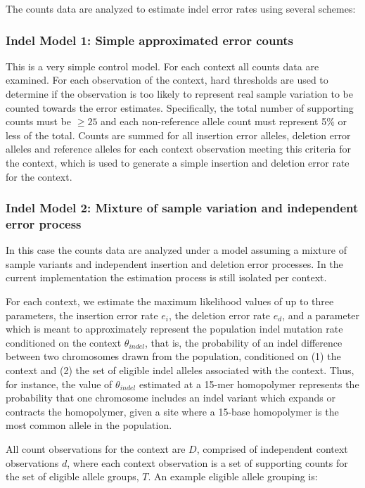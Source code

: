 \documentclass{article}
\begin{document}
The counts data are analyzed to estimate indel error rates using several schemes:

\subsubsection{Indel Model 1: Simple approximated error counts}

This is a very simple control model. For each context all counts data are examined. For each observation of the context, hard thresholds are used to determine if the observation is too likely to represent real sample variation to be counted towards the error estimates. Specifically, the total number of supporting counts must be $\geq 25$ and each non-reference allele count must represent 5\% or less of the total. Counts are summed for all insertion error alleles, deletion error alleles and reference alleles for each context observation meeting this criteria for the context, which is used to generate a simple insertion and deletion error rate for the context.

\subsubsection{Indel Model 2: Mixture of sample variation and independent error process}

In this case the counts data are analyzed under a model assuming a mixture of sample variants and independent insertion and deletion error processes. In the current implementation the estimation process is still isolated per context.

For each context, we estimate the maximum likelihood values of up to three parameters, the insertion error rate $e_i$, the deletion error rate $e_d$, and a parameter which is meant to approximately represent the population indel mutation rate conditioned on the context $\theta_{indel}$, that is, the probability of an indel difference between two chromosomes drawn from the population, conditioned on (1) the context and (2) the set of eligible indel alleles associated with the context. Thus, for instance, the value of $\theta_{indel}$ estimated at a 15-mer homopolymer represents the probability that one chromosome includes an indel variant which expands or contracts the homopolymer, given a site where a 15-base homopolymer is the most common allele in the population.

All count observations for the context are $D$, comprised of independent context observations $d$, where each context observation is a set of supporting counts for the set of eligible allele groups, $T$. An example eligible allele grouping is:
\end{document}
